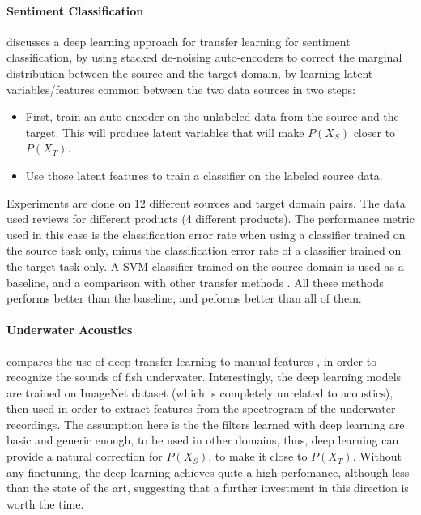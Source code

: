     \paragraph{Sentiment Classification}
     \citep{glorot2011domain} discusses a deep learning approach for transfer learning for sentiment classification, by using stacked de-noising auto-encoders \citep{vincent2008extracting} to correct the marginal distribution between the source and the target domain, by learning latent variables/features common between the two data sources in two steps:
    \begin{itemize}
        \item First, train an auto-encoder on the unlabeled data from the source and the target. This will produce latent variables that will make $P(X_S)$ closer to $P(X_T)$.
        \item Use those latent features to train a classifier on the labeled source data.
    \end{itemize}
    \par Experiments are done on 12 different sources and target domain pairs. The data used reviews for different products (4 different products). The performance metric used in this case is the classification error rate when using a classifier trained on the source task only, minus the classification error rate of a classifier trained on the target task only. A SVM classifier trained on the source domain is used as a baseline, and a comparison with other transfer methods \citep{blitzer2006domain,li2008multi,pan2010cross}. All these methods performs better than the baseline, and \citep{glorot2011domain} peforms better than all of them.

    \paragraph{Underwater Acoustics}
     \citep{malfante2018use} compares the use of deep transfer learning to manual features \citep{malfante2016automatic,malfante2018machine}, in order to recognize the sounds of fish underwater. Interestingly, the deep learning models are trained on ImageNet \citep{imagenet_cvpr09} dataset (which is completely unrelated to acoustics), then used in order to extract features from the spectrogram of the underwater recordings. The assumption here is the the filters learned with deep learning are basic and generic enough, to be used in other domains, thus, deep learning can provide a natural correction for $P(X_S)$, to make it close to $P(X_T)$. Without any finetuning, the deep learning achieves quite a high perfomance, although less than the state of the art, suggesting that a further investment in this direction is worth the time.

